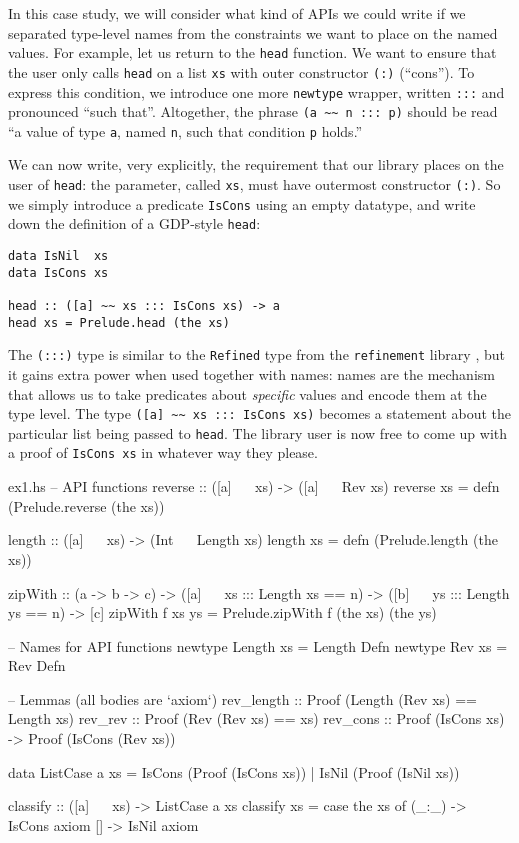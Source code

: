 \documentclass[format=sigplan, review=false, screen=true, 10pt]{acmart}
\begin{document}
In this case study, we will consider what kind of APIs we could write if we separated
type-level names from the constraints we want to place on the named values.
For example, let us return to the \texttt{head} function. We want to ensure that the
user only calls \texttt{head} on a list \texttt{xs} with outer constructor \texttt{(:)} (``cons'').
To express this condition, we introduce one more \texttt{newtype} wrapper,
written \texttt{:::} and pronounced ``such that''. Altogether, the phrase 
\verb|(a ~~ n ::: p)| should be read ``a value of type \texttt{a}, named \texttt{n}, such
that condition \texttt{p} holds.''


We can now write, very explicitly, the requirement that our library places on the user
of \texttt{head}: the parameter, called \texttt{xs}, must have outermost constructor
\texttt{(:)}. So we simply introduce a predicate \texttt{IsCons} using an empty datatype,
and write down the definition of a GDP-style \texttt{head}:
\begin{verbatim}
data IsNil  xs
data IsCons xs

head :: ([a] ~~ xs ::: IsCons xs) -> a
head xs = Prelude.head (the xs)
\end{verbatim}
The \texttt{(:::)} type is similar to the \texttt{Refined} type from the \texttt{refinement} library \cite{refined},
but it gains extra power when used together with names:
names are the mechanism that allows us to take predicates about \emph{specific} values and
encode them at the type level.
The type \verb|([a] ~~ xs ::: IsCons xs)|
becomes a statement about the particular list being passed to \texttt{head}.
The library user is now free to come up with a proof of \texttt{IsCons xs} in whatever way they please.


\begin{filecontents*}{ex1.hs}
-- API functions
reverse :: ([a] ~~ xs) -> ([a] ~~ Rev xs)
reverse xs = defn (Prelude.reverse (the xs))

length :: ([a] ~~ xs) -> (Int ~~ Length xs)
length xs = defn (Prelude.length (the xs))

zipWith :: (a -> b -> c)
         -> ([a] ~~ xs ::: Length xs == n)
         -> ([b] ~~ ys ::: Length ys == n)
         -> [c]
zipWith f xs ys = Prelude.zipWith f (the xs) (the ys)

-- Names for API functions
newtype Length xs = Length  Defn
newtype Rev    xs = Rev     Defn

-- Lemmas (all bodies are `axiom`)
rev_length :: Proof (Length (Rev xs) == Length xs)
rev_rev    :: Proof (Rev (Rev xs) == xs)
rev_cons   :: Proof (IsCons xs) -> Proof (IsCons (Rev xs))

data ListCase a xs = IsCons (Proof (IsCons xs))
                   | IsNil  (Proof (IsNil  xs))

classify :: ([a] ~~ xs) -> ListCase a xs
classify xs = case the xs of
  (_:_) -> IsCons axiom
  []    -> IsNil  axiom
\end{filecontents*}
\end{document}
